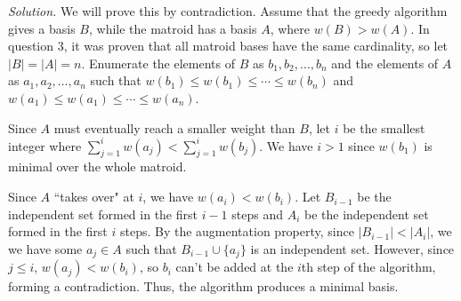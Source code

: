 \documentclass[11pt,letterpaper]{article}
\newenvironment{solution}{\color{blue}\textit{Solution.}}{\color{black}}
\begin{document}
\begin{enumerate}
\begin{solution}
        We will prove this by contradiction. Assume that the greedy algorithm gives a basis $B$, while the matroid has a basis $A$, where $w(B)>w(A)$. In question 3, it was proven that all matroid bases have the same cardinality, so let $|B|=|A|=n$. Enumerate the elements of $B$ as $b_1,b_2,\dots{},b_n$ and the elements of $A$ as $a_1,a_2,\dots{},a_n$ such that $w(b_1)\leq{w(b_1)}\leq\cdots\leq{w(b_n)}$ and $w(a_1)\leq{w(a_1)}\leq\cdots\leq{w(a_n)}$.

        Since $A$ must eventually reach a smaller weight than $B$, let $i$ be the smallest integer where $\sum_{j=1}^{i}{w(a_j)}<\sum_{j=1}^{i}{w(b_j)}$. We have $i>1$ since $w(b_1)$ is minimal over the whole matroid.

        Since $A$ ``takes over" at $i$, we have $w(a_i)<w(b_i)$. Let $B_{i-1}$ be the independent set formed in the first $i-1$ steps and $A_i$ be the independent set formed in the first $i$ steps. By the augmentation property, since $|B_{i-1}|<|A_i|$, we we have some $a_j\in{A}$ such that $B_{i-1}\cup\{a_j\}$ is an independent set. However, since $j\leq{i}$, $w(a_j)<w(b_i)$, so $b_i$ can't be added at the $i$th step of the algorithm, forming a contradiction. Thus, the algorithm produces a minimal basis.
    \end{solution}

\end{enumerate}    
\end{document}

